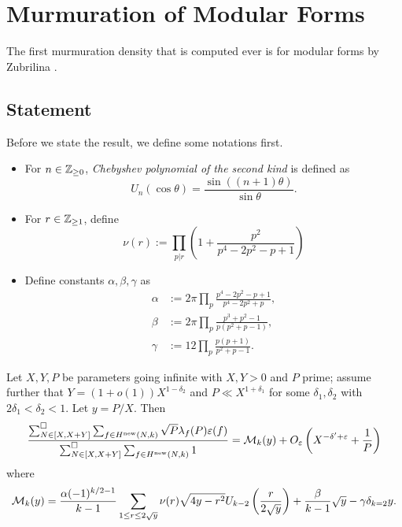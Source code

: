 \section{Murmuration of Modular Forms}
\label{sec:modform}

The first murmuration density that is computed ever is for modular forms by Zubrilina \cite{zubrilina2023murmurations}.

\subsection{Statement}

Before we state the result, we define some notations first.
\begin{itemize}
    \item For $n \in \mathbb{Z}_{\ge 0}$, \emph{Chebyshev polynomial of the second kind} is defined as
    \[
        U_n(\cos \theta) = \frac{\sin((n+1) \theta)}{\sin\theta}. 
    \]
    \item For $r \in \mathbb{Z}_{\ge 1}$, define
    \[
        \nu(r) := \prod_{p | r} \left(1 + \frac{p^2}{p^4 - 2p^2 - p + 1}\right)
    \]
    \item Define constants $\alpha, \beta, \gamma$ as
    \begin{align*}
        \alpha &:= 2\pi \prod_{p} \frac{p^4 - 2p^2 - p + 1}{p^4 - 2p^2 + p}, \\
        \beta &:= 2\pi \prod_{p} \frac{p^3 + p^2 - 1}{p(p^2 + p - 1)}, \\
        \gamma &:= 12 \prod_{p} \frac{p(p + 1)}{p^2 + p - 1}.
    \end{align*}
\end{itemize}
\begin{theorem}
    \label{thm:zubrilina_modform}
    Let $X, Y, P$ be parameters going infinite with $X, Y > 0$ and $P$ prime; assume further that $Y = (1 + o(1))X^{1 - \delta_2}$ and $P \ll X^{1 + \delta_1}$ for some $\delta_1, \delta_2$ with $2\delta_1 < \delta_2 < 1$.
    Let $y = P/X$. Then
    \begin{equation}
        \label{eqn:zubrilina_modform}
        \frac{\sum_{N \in [X, X + Y]}^\square \sum_{f \in H^{\mathrm{new}}(N, k)} \sqrt{P} \lambda_f(P) \varepsilon(f)}{\sum_{N \in  [X, X + Y]}^\square \sum_{f \in H^{\mathrm{new}}(N, k)} 1} = \mathcal{M}_k(y) + O_\varepsilon \left(X^{-\delta' + \varepsilon} + \frac{1}{P}\right)
    \end{equation}
    where
    \begin{equation}
        \mathcal{M}_k(y) = \frac{\alpha(-1)^{k/2 - 1}}{k - 1} \sum_{1 \le r \le 2\sqrt{y}} \nu(r) \sqrt{4y - r^2} U_{k - 2} \left(\frac{r}{2\sqrt{y}}\right) + \frac{\beta}{k-1} \sqrt{y} - \gamma \delta_{k=2} y.
    \end{equation}
\end{theorem}

